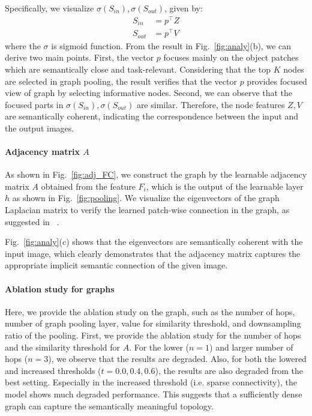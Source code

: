 \documentclass[letterpaper]{article} %
\begin{document}
Specifically, we visualize $\sigma(S_{in}), \sigma(S_{out})$, given by:
\begin{align}
	S_{in} &= p^\top Z \\
	S_{out} &= p^\top V
\end{align}
where the $\sigma$ is sigmoid function.
From the result in Fig.~\ref{fig:analy}(b), we can derive two main points.
First, the vector $p$ focuses mainly on the object patches which are semantically close and task-relevant.
Considering that the top $K$ nodes are selected in graph pooling, the result verifies that the vector $p$ provides focused view of graph by selecting informative nodes.
Second, we can observe that the focused parts in $\sigma(S_{in}), \sigma(S_{out})$ are similar. Therefore, the node features $Z, V$ are semantically coherent, indicating the correspondence between the input and the output images.




\paragraph{Adjacency matrix $A$}
As shown in Fig.~\ref{fig:adj_FC},
we construct the graph by the learnable adjacency matrix $A$ obtained from the feature $F_i$, which is the output of the learnable layer $h$ as shown in Fig.~\ref{fig:pooling}. We visualize the eigenvectors of the graph Laplacian matrix to verify the learned patch-wise connection in the graph, as suggested in ~\cite{deepSpectral}.

Fig.~\ref{fig:analy}(c) shows that the eigenvectors are semantically coherent with the input image, which clearly demonstrates that the adjacency matrix captures the appropriate implicit semantic connection of the given image.




\paragraph{Ablation study for graphs}
Here, we provide the ablation study on the graph,  such as the number of hops, number of graph pooling layer, value for similarity threshold, and downsampling ratio of the pooling.
First, we provide the ablation study for the number of hops and the similarity threshold for $A$. For the lower ($n=1$) and larger number of hops ($n=3$), we observe that the results are degraded. Also, for both the lowered and increased thresholds ($t=0.0, 0.4, 0.6$), the results are also degraded from the best setting.
Especially in the increased threshold (i.e. sparse connectivity), the model shows much degraded performance.
This suggests that a sufficiently dense graph can capture the semantically meaningful topology.
\end{document}
